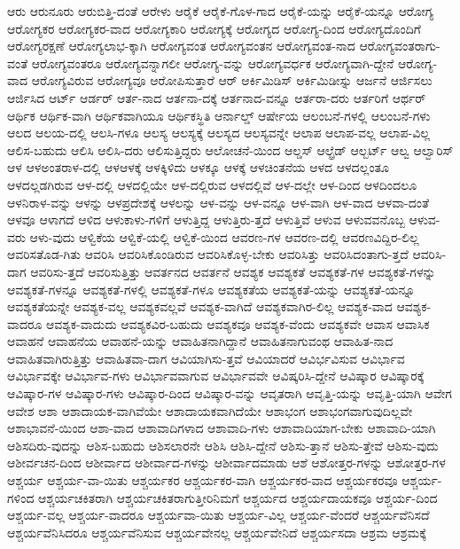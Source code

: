 {ಆರು
ಆರುನೂರು
ಆರುಬಿತ್ತಿ-ದಂತೆ
ಆರೇಳು
ಆರೈಕೆ
ಆರೈಕೆ-ಗೊಳ-ಗಾದ
ಆರೈಕೆ-ಯನ್ನು
ಆರೈಕೆ-ಯನ್ನೂ
ಆರೋಗ್ಯ
ಆರೋಗ್ಯಕರ
ಆರೋಗ್ಯಕರ-ವಾದ
ಆರೋಗ್ಯಕಾರಿ
ಆರೋಗ್ಯಕ್ಕೆ
ಆರೋಗ್ಯದ
ಆರೋಗ್ಯ-ದಿಂದ
ಆರೋಗ್ಯದೊಂದಿಗೆ
ಆರೋಗ್ಯರಕ್ಷಣೆ
ಆರೋಗ್ಯಲಾಭ-ಕ್ಕಾಗಿ
ಆರೋಗ್ಯವಂತ
ಆರೋಗ್ಯವಂತನ
ಆರೋಗ್ಯವಂತ-ನಾದ
ಆರೋಗ್ಯವಂತರಾಗು-ವಂತೆ
ಆರೋಗ್ಯವಂತರೂ
ಆರೋಗ್ಯವನ್ನಾಗಲೀ
ಆರೋಗ್ಯ-ವನ್ನು
ಆರೋಗ್ಯವರ್ಧಕ
ಆರೋಗ್ಯವಾಗಿ-ದ್ದೇನೆ
ಆರೋಗ್ಯ-ವಾದ
ಆರೋಗ್ಯವಿರುವ
ಆರೋಗ್ಯವೂ
ಆರೋಪಿಸುತ್ತಾರೆ
ಆರ್
ಆರ್ಕಿಮಿಡಿಸ್
ಆರ್ಕಿಮಿಡೀಸ್ನು
ಆರ್ಜನೆ
ಆರ್ಜಿಸಲು
ಆರ್ಜಿಸಿದ
ಆರ್ಟ್
ಆರ್ಡರ್
ಆರ್ತ-ನಾದ
ಆರ್ತನಾ-ದಕ್ಕೆ
ಆರ್ತನಾದ-ವನ್ನೂ
ಆರ್ತರಾ-ದರು
ಆರ್ತರಿಗೆ
ಆರ್ಥರ್
ಆರ್ಥಿಕ
ಆರ್ಥಿಕ-ವಾಗಿ
ಆರ್ಥಿಕವಾಗಿಯೂ
ಆರ್ಥಿಕಸ್ಥಿತಿ
ಆರ್ನಾಲ್ಡ್
ಆರ್ಷೇಯ
ಆಲಂಬನೆ-ಗಳಲ್ಲಿ
ಆಲಂಬನೆ-ಗಳು
ಆಲದ
ಆಲಯ-ದಲ್ಲಿ
ಆಲಸಿ-ಗಳೂ
ಆಲಸ್ಯ
ಆಲಸ್ಯಕ್ಕೆ
ಆಲಸ್ಯದ
ಆಲಸ್ಯವನ್ನೇ
ಆಲಾಪ
ಆಲಾಪ-ವಲ್ಲ
ಆಲಾಪ-ವಿಲ್ಲ
ಆಲಿಸ-ಬಹುದು
ಆಲಿಸಿ
ಆಲಿಸಿ-ದರು
ಆಲಿಸುತ್ತಿದ್ದರು
ಆಲೋಚನೆ-ಯಿಂದ
ಆಲ್ಡಸ್
ಆಲ್ಫ್ರೆಡ್
ಆಲ್ಬರ್ಟ್
ಆಲ್ವ
ಆಲ್ವಾರಿಸ್
ಆಳ
ಆಳಅಂತರಾಳ-ದಲ್ಲಿ
ಆಳಆಳಕ್ಕೆ
ಆಳಕ್ಕಿಳಿದು
ಆಳಕ್ಕೂ
ಆಳಕ್ಕೆ
ಆಳಚಿಂತನೆಯ
ಆಳದ
ಆಳದಲ್ಲಂತೂ
ಆಳದಲ್ಲಡಗಿರುವ
ಆಳ-ದಲ್ಲಿ
ಆಳದಲ್ಲಿಯೇ
ಆಳ-ದಲ್ಲಿರುವ
ಆಳದಲ್ಲಿವೆ
ಆಳ-ದಲ್ಲೇ
ಆಳ-ದಿಂದ
ಆಳದಿಂದಲೂ
ಆಳನಿರಾಳ-ವನ್ನು
ಆಳನ್ನು
ಆಳಪ್ರದೇಶಕ್ಕೆ
ಆಳಲನ್ನು
ಆಳ-ವನ್ನು
ಆಳ-ವನ್ನೂ
ಆಳ-ವಾಗಿ
ಆಳ-ವಾದ
ಆಳವಾ-ದಂತೆ
ಆಳವೂ
ಆಳಾಗದೆ
ಆಳಿದ
ಆಳುಕಾಳು-ಗಳಿಗೆ
ಆಳುತ್ತಿದ್ದ
ಆಳುತ್ತಿರು-ತ್ತದೆ
ಆಳುತ್ತಿವೆ
ಆಳುವ
ಆಳುವವನೊಬ್ಬ
ಆಳುವ-ವರು
ಆಳು-ವುದು
ಆಳ್ವಿಕೆಯ
ಆಳ್ವಿಕೆ-ಯಲ್ಲಿ
ಆಳ್ವಿಕೆ-ಯಿಂದ
ಆವರಣ-ಗಳ
ಆವರಣ-ದಲ್ಲಿ
ಆವರಣವಿದ್ದಿರ-ಲಿಲ್ಲ
ಆವರಿಸತೊಡ-ಗಿತು
ಆವರಿಸಿ
ಆವರಿಸಿಕೊಂಡಿರುವ
ಆವರಿಸಿಕೊಳ್ಳ-ಬೇಕು
ಆವರಿಸಿತ್ತು
ಆವರಿಸಿದಂತಾಗು-ತ್ತದೆ
ಆವರಿಸಿ-ದಾಗ
ಆವರಿಸು-ತ್ತದೆ
ಆವರಿಸುತ್ತಿತ್ತು
ಆವರ್ತನದ
ಆವರ್ತನೆ
ಆವಶ್ಯಕ
ಆವಶ್ಯಕತೆ
ಆವಶ್ಯಕತೆ-ಗಳ
ಆವಶ್ಯಕತೆ-ಗಳನ್ನು
ಆವಶ್ಯಕತೆ-ಗಳನ್ನೂ
ಆವಶ್ಯಕತೆ-ಗಳಲ್ಲಿ
ಆವಶ್ಯಕತೆ-ಗಳೂ
ಆವಶ್ಯಕತೆಯ
ಆವಶ್ಯಕತೆ-ಯನ್ನು
ಆವಶ್ಯಕತೆ-ಯನ್ನೂ
ಆವಶ್ಯಕತೆಯನ್ನೇ
ಆವಶ್ಯಕ-ವಲ್ಲ
ಆವಶ್ಯಕವಲ್ಲವೆ
ಆವಶ್ಯಕ-ವಾಗಿದೆ
ಆವಶ್ಯಕವಾಗಿರ-ಲಿಲ್ಲ
ಆವಶ್ಯಕ-ವಾದ
ಆವಶ್ಯಕ-ವಾದರೂ
ಆವಶ್ಯಕ-ವಾದುದು
ಆವಶ್ಯಕವಿರ-ಬಹುದು
ಆವಶ್ಯಕವೂ
ಆವಶ್ಯಕ-ವೆಂದು
ಆವಶ್ಯಕವೇ
ಆವಾಸ
ಆವಾಸಿಕ
ಆವಾಹನೆ
ಆವಾಹನೆಯ
ಆವಾಹನೆ-ಯನ್ನು
ಆವಾಹಿತನಾಗಿದ್ದಾನೆ
ಆವಾಹಿತನಾಗುವಂಥ
ಆವಾಹಿತ-ನಾದ
ಆವಾಹಿತವಾಗಿರುತ್ತಿತ್ತು
ಆವಾಹಿತವಾ-ದಾಗ
ಆವಿಯಾಗಿಸು-ತ್ತವೆ
ಆವಿಯಾದರೆ
ಆವಿರ್ಭವಿಸುವ
ಆವಿರ್ಭಾವ
ಆವಿರ್ಭಾವಕ್ಕೇ
ಆವಿರ್ಭಾವ-ಗಳು
ಆವಿರ್ಭಾವವಾಗುವ
ಆವಿರ್ಭಾವವೇ
ಆವಿಷ್ಕರಿಸಿ-ದ್ದೇನೆ
ಆವಿಷ್ಕಾರ
ಆವಿಷ್ಕಾರಕ್ಕೆ
ಆವಿಷ್ಕಾರ-ಗಳ
ಆವಿಷ್ಕಾರ-ಗಳು
ಆವಿಷ್ಕಾರ-ದಿಂದ
ಆವಿಷ್ಕಾರ-ವನ್ನು
ಆವೃತರಾಗಿ
ಆವೃತ್ತಿ-ಯನ್ನು
ಆವೃತ್ತಿ-ಯಾಗಿ
ಆವೇಗ
ಆವೇಶ
ಆಶಾ
ಆಶಾದಾಯಕ-ವಾಗಿವೆಯೇ
ಆಶಾದಾಯಕವಾಗಿದೆಯೇ
ಆಶಾಭಂಗ
ಆಶಾಭಂಗವಾಗುವುದಿಲ್ಲವೇ
ಆಶಾಭಾವನೆ-ಯಿಂದ
ಆಶಾ-ವಾದ
ಆಶಾವಾದಿಗಳಾದ
ಆಶಾವಾದಿ-ಗಳು
ಆಶಾವಾದಿಯಾಗ-ಬೇಕು
ಆಶಾವಾದಿ-ಯಾಗಿ
ಆಶಿಸದಿರು-ವುದನ್ನು
ಆಶಿಸ-ಬಹುದು
ಆಶಿಸಲಾರನೇ
ಆಶಿಸಿ
ಆಶಿಸಿ-ದ್ದೇನೆ
ಆಶಿಸು-ತ್ತಾನೆ
ಆಶಿಸು-ತ್ತೇವೆ
ಆಶಿಸು-ವುದು
ಆಶೀರ್ವಚನ-ದಿಂದ
ಆಶೀರ್ವಾದ
ಆಶೀರ್ವಾದ-ಗಳನ್ನು
ಆಶೀರ್ವಾದಮಾಡು
ಆಶೆ
ಆಶೋತ್ತರ-ಗಳನ್ನು
ಆಶೋತ್ತರ-ಗಳ
ಆಶ್ಚರ್ಯ
ಆಶ್ಚರ್ಯ-ವಾ-ಯಿತು
ಆಶ್ಚರ್ಯಕರ
ಆಶ್ಚರ್ಯಕರ-ವಾಗಿ
ಆಶ್ಚರ್ಯಕರ-ವಾದ
ಆಶ್ಚರ್ಯಕರವೂ
ಆಶ್ಚರ್ಯ-ಗಳಿಂದ
ಆಶ್ಚರ್ಯಚಕಿತರಾಗಿ
ಆಶ್ಚರ್ಯಚಕಿತರಾಗುತ್ತೀರಿನಿಮಗೆ
ಆಶ್ಚರ್ಯದ
ಆಶ್ಚರ್ಯದಾಯಕವೂ
ಆಶ್ಚರ್ಯ-ದಿಂದ
ಆಶ್ಚರ್ಯ-ವಲ್ಲ
ಆಶ್ಚರ್ಯ-ವಾದರೂ
ಆಶ್ಚರ್ಯವಾ-ಯಿತು
ಆಶ್ಚರ್ಯ-ವಿಲ್ಲ
ಆಶ್ಚರ್ಯ-ವೆಂದರೆ
ಆಶ್ಚರ್ಯವೆನಿಸದೆ
ಆಶ್ಚರ್ಯವೆನಿಸಿದರೂ
ಆಶ್ಚರ್ಯವೆನಿಸುವ
ಆಶ್ಚರ್ಯವೇನಲ್ಲ
ಆಶ್ಚರ್ಯವೇನಿದೆ
ಆಶ್ಚರ್ಯಸದಾ
ಆಶ್ರಮ
ಆಶ್ರಮಕ್ಕೆ
}
